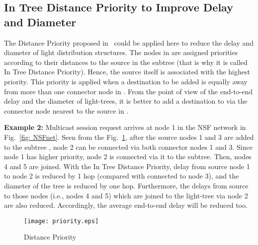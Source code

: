 \documentclass[conference]{IEEEtran}
\begin{document}
\subsection{In Tree Distance Priority to Improve Delay and Diameter}
\label{subsec: Distance Priority to Improve Delay and Diameter}
The Distance Priority proposed in~\cite{fZhou2008ICCS} could be applied here to reduce the delay and diameter of light distribution structures. The nodes in  are assigned priorities according to their distances to the source in the subtree  (that is why it is called In Tree Distance Priority). Hence, the source itself is associated with the highest priority. This priority is applied when a destination to be added is equally away from more than one connector node in . From the point of view of the end-to-end delay and the diameter of light-trees, it is better to add a destination to  via the connector node nearest to the source in .

\textbf{Example 2:}
Multicast session  request arrives at node 1 in the NSF network in Fig.~\ref{fig: NSFnet}. Seen from the Fig.~\ref{fig: priority}, after the source nodes 1 and 3 are added to the subtree , node 2 can be connected via both connector nodes 1 and 3.  Since node 1 has higher priority, node 2 is connected via it to the subtree. Then, nodes 4 and 5 are joined. With the In Tree Distance Priority, delay from source node 1 to node 2 is reduced by 1 hop (compared with connected to node 3), and the diameter of the tree is reduced by one hop. Furthermore, the delays from source to those nodes (i.e., nodes 4 and 5) which are joined to the light-tree via node 2 are also reduced. Accordingly, the average end-to-end delay will be reduced too.

\begin{figure}
        \centering
        \texttt{[image: priority.eps]}
        \caption{Distance Priority}
        \label{fig: priority}
\end{figure}
\end{document}
